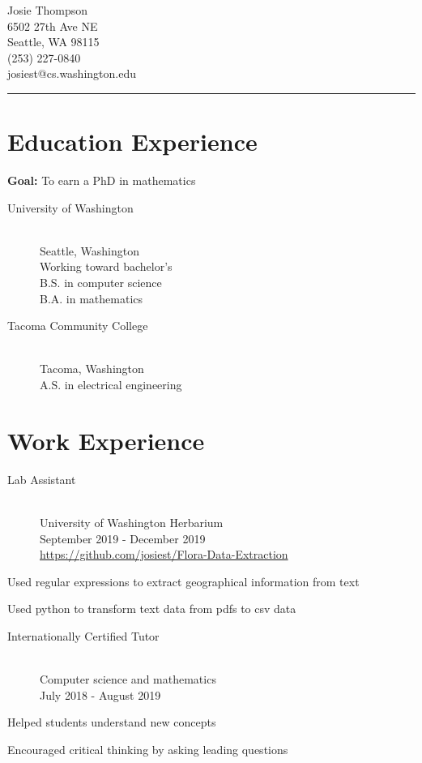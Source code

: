 \documentclass[10pt]{article}
\newenvironment{itemize*}
{\begin{itemize}[leftmargin=*]
    \setlength{\itemsep}{0pt}
    \setlength{\parskip}{0pt}}
{\end{itemize}}
\begin{document}
\noindent
\parbox[t]{0.5\textwidth}{
    {\sffamily\Huge Josie Thompson}\medskip\\
    6502 27th Ave NE\\
    Seattle, WA 98115\\
    (253) 227-0840\\
    josiest@cs.washington.edu
}
\vspace{12pt}
\hrule

\begin{paracol}{2}
\section*{Education Experience}
\textbf{Goal:} To earn a PhD in mathematics
\begin{description}
\item[University of Washington]~\\
    Seattle, Washington\\
    Working toward bachelor's\\
    B.S. in computer science\\
    B.A. in mathematics
\item[Tacoma Community College]~\\
    Tacoma, Washington\\
    A.S. in electrical engineering
\end{description}
\section*{Work Experience}
\begin{description}
\item[Lab Assistant]~\\
    University of Washington Herbarium\\
    September 2019 - December 2019\\
    \url{https://github.com/josiest/Flora-Data-Extraction}
\end{description}
\begin{itemize*}
\item Used regular expressions to extract geographical information from text
\item Used python to transform text data from pdfs to csv data
\end{itemize*}

\begin{description}
\item[Internationally Certified Tutor]~\\
    Computer science and mathematics\\
    July 2018 - August 2019
\end{description}
\begin{itemize*}
\item Helped students understand new concepts
\item Encouraged critical thinking by asking leading questions
\end{itemize*}


\end{paracol}
\end{document}
